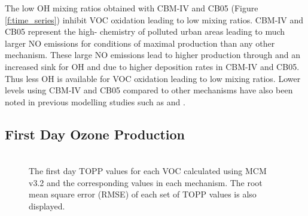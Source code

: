 The low OH mixing ratios obtained with CBM-IV and CB05 (Figure \ref{f:time_series}) inhibit VOC oxidation leading to low  mixing ratios.
CBM-IV and CB05 represent the high- chemistry of polluted urban areas leading to much larger NO emissions for conditions of maximal  production than any other mechanism.
These large NO emissions lead to higher  production through  and an increased sink for OH and  due to higher  deposition rates in CBM-IV and CB05.
Thus less OH is available for VOC oxidation leading to low  mixing ratios.
Lower  levels using CBM-IV and CB05 compared to other mechanisms have also been noted in previous modelling studies such as \citet{Emmerson:2009} and \citet{Saylor:2012}.

\subsection{First Day Ozone Production} \label{ss:day1} %

\begin{figure}
    \centering
    \includegraphics[width=\textwidth]{img/first_day_values}
    \vspace{1mm}
    \caption{The first day TOPP values for each VOC calculated using MCM v3.2 and the corresponding values in each mechanism. The root mean square error (RMSE) of each set of TOPP values is also displayed.}
    \vspace{-4mm}
    \label{f:first_day}
\end{figure}

